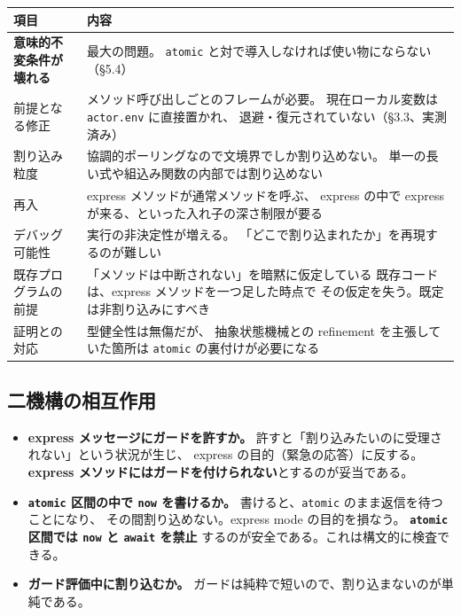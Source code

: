 \documentclass[11pt,a4paper]{ltjsarticle}
\theoremstyle{remark}
\begin{document}
\begin{center}
\small
\begin{tabular}{@{}lp{8.8cm}@{}}
\toprule
項目 & 内容 \\
\midrule
\textbf{意味的不変条件が壊れる} & 最大の問題。
  \texttt{atomic} と対で導入しなければ使い物にならない（\S 5.4）\\
前提となる修正 & メソッド呼び出しごとのフレームが必要。
  現在ローカル変数は \texttt{actor.env} に直接置かれ、
  退避・復元されていない（\S 3.3、実測済み）\\
割り込み粒度 & 協調的ポーリングなので文境界でしか割り込めない。
  単一の長い式や組込み関数の内部では割り込めない \\
再入 & express メソッドが通常メソッドを呼ぶ、
  express の中で express が来る、といった入れ子の深さ制限が要る \\
デバッグ可能性 & 実行の非決定性が増える。
  「どこで割り込まれたか」を再現するのが難しい \\
既存プログラムの前提 & 「メソッドは中断されない」を暗黙に仮定している
  既存コードは、express メソッドを一つ足した時点で
  その仮定を失う。既定は非割り込みにすべき \\
証明との対応 & 型健全性は無傷だが、
  抽象状態機械との refinement を主張していた箇所は
  \texttt{atomic} の裏付けが必要になる \\
\bottomrule
\end{tabular}
\end{center}

\subsection{二機構の相互作用}

\begin{itemize}
\item \textbf{express メッセージにガードを許すか。}
  許すと「割り込みたいのに受理されない」という状況が生じ、
  express の目的（緊急の応答）に反する。
  \textbf{express メソッドにはガードを付けられない}とするのが妥当である。

\item \textbf{\texttt{atomic} 区間の中で \texttt{now} を書けるか。}
  書けると、\texttt{atomic} のまま返信を待つことになり、
  その間割り込めない。express mode の目的を損なう。
  \textbf{\texttt{atomic} 区間では \texttt{now} と \texttt{await} を禁止}
  するのが安全である。これは構文的に検査できる。

\item \textbf{ガード評価中に割り込むか。}
  ガードは純粋で短いので、割り込まないのが単純である。
\end{itemize}
\end{document}
